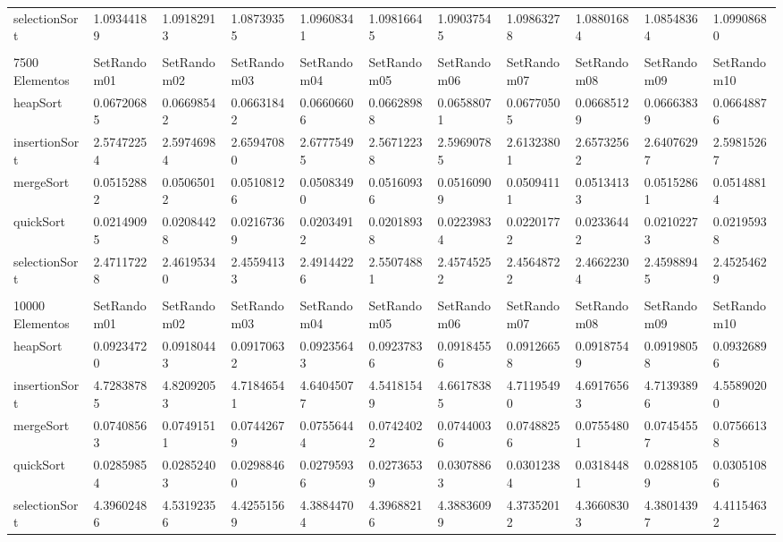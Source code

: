 \documentclass[article,a4paper]{article}
\begin{document}
\begin{table}[h]
{\begin{tabular}{lllllllllll}
selectionSort   & 1.09344189  & 1.09182913  & 1.08739355  & 1.09608341  & 1.09816645  & 1.09037545  & 1.09863278  & 1.08801684  & 1.08548364  & 1.09908680  \\
                &             &             &             &             &             &             &             &             &             &             \\
7500 Elementos  & SetRandom01 & SetRandom02 & SetRandom03 & SetRandom04 & SetRandom05 & SetRandom06 & SetRandom07 & SetRandom08 & SetRandom09 & SetRandom10 \\
heapSort        & 0.06720685  & 0.06698542  & 0.06631842  & 0.06606606  & 0.06628988  & 0.06588071  & 0.06770505  & 0.06685129  & 0.06663839  & 0.06648876  \\
insertionSort   & 2.57472254  & 2.59746984  & 2.65947080  & 2.67775495  & 2.56712238  & 2.59690785  & 2.61323801  & 2.65732562  & 2.64076297  & 2.59815267  \\
mergeSort       & 0.05152882  & 0.05065012  & 0.05108126  & 0.05083490  & 0.05160936  & 0.05160909  & 0.05094111  & 0.05134133  & 0.05152861  & 0.05148814  \\
quickSort       & 0.02149095  & 0.02084428  & 0.02167369  & 0.02034912  & 0.02018938  & 0.02239834  & 0.02201772  & 0.02336442  & 0.02102273  & 0.02195938  \\
selectionSort   & 2.47117228  & 2.46195340  & 2.45594133  & 2.49144226  & 2.55074881  & 2.45745252  & 2.45648722  & 2.46622304  & 2.45988945  & 2.45254629  \\
                &             &             &             &             &             &             &             &             &             &             \\
10000 Elementos & SetRandom01 & SetRandom02 & SetRandom03 & SetRandom04 & SetRandom05 & SetRandom06 & SetRandom07 & SetRandom08 & SetRandom09 & SetRandom10 \\
heapSort        & 0.09234720  & 0.09180443  & 0.09170632  & 0.09235643  & 0.09237836  & 0.09184556  & 0.09126658  & 0.09187549  & 0.09198058  & 0.09326896  \\
insertionSort   & 4.72838785  & 4.82092053  & 4.71846541  & 4.64045077  & 4.54181549  & 4.66178385  & 4.71195490  & 4.69176563  & 4.71393896  & 4.55890200  \\
mergeSort       & 0.07408563  & 0.07491511  & 0.07442679  & 0.07556444  & 0.07424022  & 0.07440036  & 0.07488256  & 0.07554801  & 0.07454557  & 0.07566138  \\
quickSort       & 0.02859854  & 0.02852403  & 0.02988460  & 0.02795936  & 0.02736539  & 0.03078863  & 0.03012384  & 0.03184481  & 0.02881059  & 0.03051086  \\
selectionSort   & 4.39602486  & 4.53192356  & 4.42551569  & 4.38844704  & 4.39688216  & 4.38836099  & 4.37352012  & 4.36608303  & 4.38014397  & 4.41154632 
\end{tabular}}
\end{table}
\end{document}
